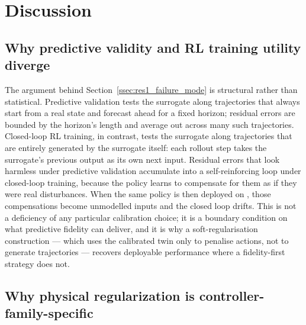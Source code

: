 \section{Discussion}
\label{sec:discussion}

\subsection{Why predictive validity and RL training utility diverge}
\label{ssec:dis_divergence}

The argument behind Section~\ref{ssec:res1_failure_mode} is structural
rather than statistical. Predictive validation tests the surrogate along
trajectories that always start from a real \boptest{} state and forecast
ahead for a fixed horizon; residual errors are bounded by the
horizon's length and average out across many such trajectories. Closed-loop
RL training, in contrast, tests the surrogate along trajectories that
are entirely generated by the surrogate itself: each rollout step takes
the surrogate's previous output as its own next input. Residual errors
that look harmless under predictive validation accumulate into a
self-reinforcing loop under closed-loop training, because the policy
learns to compensate for them as if they were real disturbances. When
the same policy is then deployed on \boptest, those compensations
become unmodelled inputs and the closed loop drifts. This is not a
deficiency of any particular calibration choice; it is a boundary
condition on what predictive fidelity can deliver, and it is why a
soft-regularisation construction --- which uses the calibrated twin only
to penalise actions, not to generate trajectories --- recovers
deployable performance where a fidelity-first strategy does not.

\subsection{Why physical regularization is controller-family-specific}
\label{ssec:dis_controller_family}

